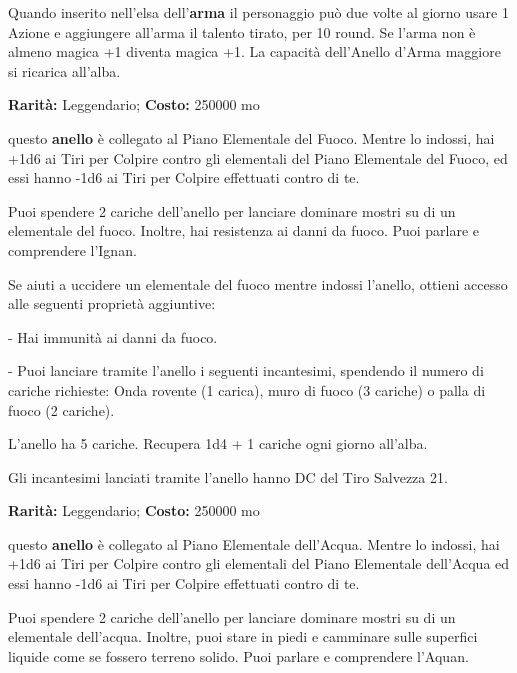 \begin{multicols}{2}
\begin{tabularx}{\linewidth}{lX|lX}
\end{tabularx}

\medskip

Quando inserito nell'elsa dell'\textbf{arma} il personaggio può due volte al giorno usare 1 Azione e aggiungere all'arma il talento tirato, per 10 round. Se l'arma non è almeno magica +1 diventa magica +1. La capacità dell'Anello d'Arma maggiore si ricarica all'alba.


\textbf{Rarità:} Leggendario; \textbf{Costo:} 250000 mo

questo \textbf{anello} è collegato al Piano Elementale del Fuoco. Mentre lo indossi, hai +1d6 ai Tiri per Colpire contro gli elementali del Piano Elementale del Fuoco, ed essi hanno -1d6 ai Tiri per Colpire effettuati contro di te.

Puoi spendere 2 cariche dell'anello per lanciare dominare mostri su di un elementale del fuoco. Inoltre, hai resistenza ai danni da fuoco. Puoi parlare e comprendere l'Ignan.

Se aiuti a uccidere un elementale del fuoco mentre indossi l'anello, ottieni accesso alle seguenti proprietà aggiuntive:

\smallskip- Hai immunità ai danni da fuoco.

\smallskip- Puoi lanciare tramite l'anello i seguenti incantesimi, spendendo il numero di cariche richieste: Onda rovente (1 carica), muro di fuoco (3 cariche) o palla di fuoco (2 cariche).

\medskip

L'anello ha 5 cariche. Recupera 1d4 + 1 cariche ogni giorno all'alba.

Gli incantesimi lanciati tramite l'anello hanno DC del Tiro Salvezza 21.


\textbf{Rarità:} Leggendario; \textbf{Costo:} 250000 mo

questo \textbf{anello} è collegato al Piano Elementale dell'Acqua. Mentre lo indossi, hai +1d6 ai Tiri per Colpire contro gli elementali del Piano Elementale dell'Acqua ed essi hanno -1d6 ai Tiri per Colpire effettuati contro di te.

Puoi spendere 2 cariche dell'anello per lanciare dominare mostri su di un elementale dell'acqua. Inoltre, puoi stare in piedi e camminare sulle superfici liquide come se fossero terreno solido. Puoi parlare e comprendere l'Aquan.


\end{multicols}

